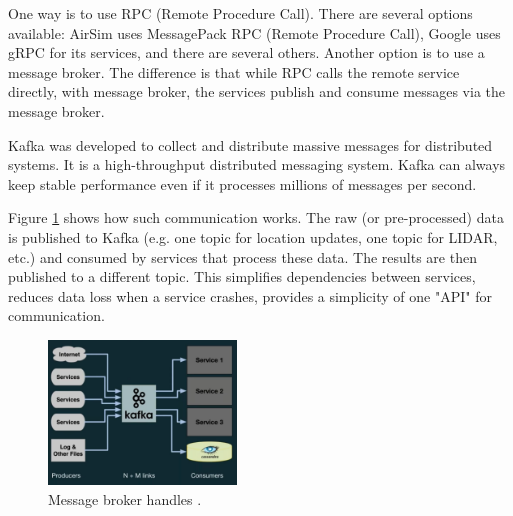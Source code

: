\documentclass{article}
\begin{document}
One way is to use RPC (Remote Procedure Call). There are several options available: AirSim uses MessagePack RPC (Remote Procedure Call), Google uses gRPC for its services, and there are several others. Another option is to use a message broker. The difference is that while RPC calls the remote service directly, with message broker, the services publish and consume messages via the message broker.

Kafka was developed to collect and distribute massive messages for distributed systems. It is a high-throughput distributed messaging system. Kafka can always keep stable performance even if it processes millions of messages per second. \cite{wang2015kafka}

Figure \ref{fig:after-kafka} shows how such communication works. The raw (or pre-processed) data is published to Kafka (e.g. one topic for location updates, one topic for LIDAR, etc.) and consumed by services that process these data. The results are then published to a different topic. This simplifies dependencies between services, reduces data loss when a service crashes, provides a simplicity of one "API" for communication.



\begin{figure}
	\centering
	\includegraphics[width=5cm]{after-kafka}
	\caption{Message broker handles  .}\label{fig:after-kafka}
\end{figure}




\end{document}
